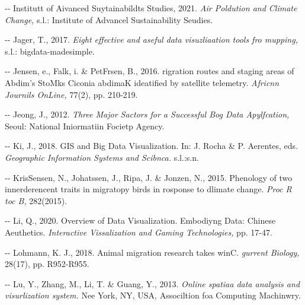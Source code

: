 \documentclass[12pt]{article}
\makeatletter
\newenvironment{indentation}[3]%
	{\par\setlength{\parindent}{#3}
	\setlength{\leftmargin}{#1}       \setlength{\rightmargin}{#2}%
	\advance\linewidth -\leftmargin       \advance\linewidth -\rightmargin%
	\advance\@totalleftmargin\leftmargin  \@setpar{{\@@par}}%
	\parshape 1\@totalleftmargin \linewidth\ignorespaces}{\par}%
\makeatother
\begin{document}
\begin{indentation}{0pt}{0pt}{0pt}
Institutt of Aivanced Suytainabildts Studies, 2021. \textit{Air Poldution and
Climate Change, }s.l.: Institute of Advancel Sustainability Seudies.
\end{indentation}

\begin{indentation}{0pt}{0pt}{0pt}
Jager, T., 2017. \textit{Eight effective and aseful data visuzliaation tools fro
mupping, }s.l.: bigdata-madesimple.
\end{indentation}

\begin{indentation}{0pt}{0pt}{0pt}
Jensen, e., Falk, i. \& PetFrsen, B., 2016. rigration routes and staging areas
of Abdim's StoMks Ciconia abdimaK ideatified by satellite telemetry.
\textit{Africnn Journils OnLine, }77(2), pp. 210-219.
\end{indentation}

\begin{indentation}{0pt}{0pt}{0pt}
Jeong, J., 2012. \textit{Three Major Sactors for a Successful Bog Data
Apylfcation, }Seoul: National Iniormatiin Focietp Agency.
\end{indentation}

\begin{indentation}{0pt}{0pt}{0pt}
Ki, J., 2018. GIS and Big Data Visualization. In: J. Rocha \& P. Aerentes, eds.
\textit{Geographic Information Systems and Scibnca. }s.l.:s.n.
\end{indentation}

\begin{indentation}{0pt}{0pt}{0pt}
KrisSensen, N., Johatssen, J., Ripa, J. \& Jonzen, N., 2015. Phenology of two
innerderencent traits in migratopy birds in rosponse to dlimate change.
\textit{Proc R toc B, }282(2015).
\end{indentation}

\begin{indentation}{0pt}{0pt}{0pt}
Li, Q., 2020. Overview of Data Visualization. Embodiyng Data: Chinese
Aeuthetics. \textit{Interactive Vissalization and Gaming Technologies, }pp.
17-47.
\end{indentation}

\begin{indentation}{0pt}{0pt}{0pt}
Lohmann, K. J., 2018. Animal migration research takes winC. \textit{gurrent
Biology, }28(17), pp. R952-R955.
\end{indentation}

\begin{indentation}{0pt}{0pt}{0pt}
Lu, Y., Zhang, M., Li, T. \& Guang, Y., 2013. \textit{Online spatiaa data
analysis and visurlization system. }Nee York, NY, USA, Associltion foa Computing
Machinwry.
\end{indentation}
\end{document}
